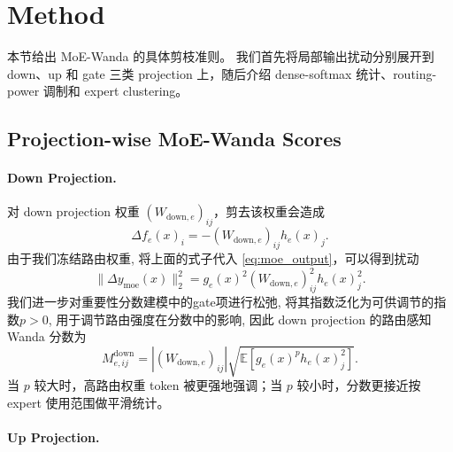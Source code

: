 \documentclass[letterpaper]{article}
\begin{document}
\section{Method}

本节给出 MoE-Wanda 的具体剪枝准则。
我们首先将局部输出扰动分别展开到 down、up 和 gate 三类 projection 上，随后介绍 dense-softmax 统计、routing-power 调制和 expert clustering。

\subsection{Projection-wise MoE-Wanda Scores}

\paragraph{Down Projection.}

对 down projection 权重 $(W_{\mathrm{down},e})_{ij}$，剪去该权重会造成
\begin{equation}
    \Delta f_e(x)_i
    =
    -(W_{\mathrm{down},e})_{ij} h_e(x)_j.
\end{equation}
由于我们冻结路由权重, 将上面的式子代入 \eqref{eq:moe_output}，可以得到扰动
\begin{equation}
    \|\Delta y_{\mathrm{moe}}(x)\|_2^2
    =
    g_e(x)^2
    (W_{\mathrm{down},e})_{ij}^{2}
    h_e(x)_j^2.
\end{equation}
我们进一步对重要性分数建模中的gate项进行松弛, 将其指数泛化为可供调节的指数$p>0$, 用于调节路由强度在分数中的影响, 因此 down projection 的路由感知 Wanda 分数为
\begin{equation}
    M^{\mathrm{down}}_{e,ij}
    =
    |(W_{\mathrm{down},e})_{ij}|
    \sqrt{
    \mathbb{E}
    \left[
        g_e(x)^p h_e(x)_j^2
    \right]
    }.
    \label{eq:down_score}
\end{equation}
当 $p$ 较大时，高路由权重 token 被更强地强调；当 $p$ 较小时，分数更接近按 expert 使用范围做平滑统计。

\paragraph{Up Projection.}
\end{document}
